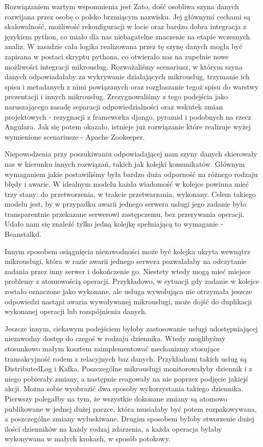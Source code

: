 \documentclass[licencjacka]{pracamgr}
\begin{document}
Rozwiązaniem wartym wspomnienia jest Zato, dość osobliwa szyna danych rozwijana przez osobę o polsko brzmiącym nazwisku. Jej głównymi cechami są skalowalność, możliwość rekonfiguracji w locie oraz bardzo dobra integracja z językiem python, co miało dla nas niebagatelne znaczenie na etapie wczesnych analiz. W zasadzie cała logika realizowana przez tę szynę danych mogła być zapisana w postaci skryptu pythona, co otwierało nas na zupełnie nowe możliwości integracji mikrousług. Rozważaliśmy scenariusz, w którym szyna danych odpowiadałaby za wykrywanie działających mikrousług, trzymanie ich spisu i metadanych z nimi powiązanych oraz rozgłaszanie tegoż spisu do warstwy prezentacji i innych mikrousług. Zrezygnowaliśmy z tego podejścia jako naruszającego zasadę separacji odpowiedzialności oraz wskutek zmian projektowych - rezygnacji z frameworka django, pyramid i podobnych na rzecz Angulara. Jak się potem okazało, istnieje już rozwiązanie które realizuje wyżej wymienione scenariusze - Apache Zookeeper.

Niepowodzenia przy poszukiwaniu odpowiadającej nam szyny danych skierowały nas w kierunku innych rozwiązań, takich jak
kolejki komunikatów. Głównym wymaganiem jakie postawiliśmy była bardzo duża odporność na różnego rodzaju błędy i
awarie. W idealnym modelu każda wiadomość w kolejce powinna mieć trzy stany: do przetworzenia, w trakcie przetwarzania, wykonany. Celem takiego modelu jest, by w przypadku awarii jednego serwera usługi jego zadanie było transparentnie przekazane serwerowi zastępczemu, bez przerywania operacji. Udało nam się znaleźć tylko jedną kolejkę spełniającą to wymaganie - Beanstalkd.

Innym sposobem osiągnięcia niezawodności może być kolejka ukryta wewnątrz mikrousługi, która w razie awarii jednego serwera pozwalałaby na odczytanie zadania przez inny serwer i dokończenie go. Niestety wtedy mogą mieć miejsce problemy z atomowością operacji. Przykładowo, w sytuacji gdy zadanie w kolejce zostało oznaczone jako wykonane, ale usługa wywołująca nie otrzymała jeszcze odpowiedzi nastąpi awaria wywoływanej mikrousługi, może dojść do duplikacji wykonanej operacji lub rozspójnienia danych.

Jeszcze innym, ciekawym podejściem byłoby zastosowanie usługi udostępniającej niezawodny dostęp do czegoś w rodzaju dziennika. Wtedy moglibyśmy stosunkowo małym kosztem zaimplementować mechanizmy stosujące transakcyjność rodem z relacyjnych baz danych. Przykładami takich usług są DistributedLog i Kafka. Poszczególne mikrousługi monitorowałyby dziennik i z niego pobierały zmiany, a następnie reagowały na nie poprzez podjęcie jakiejś akcji. Można sobie wyobrazić dwa sposoby wykorzystania takiego dziennika. Pierwszy polegałby na tym, że wszystkie dokonane zmiany są atomowo publikowane w jednej dużej paczce, która musiałaby być potem rozpakowywana, a poszczególne zmiany wyłuskiwane. Drugim sposobem byłoby stworzenie dużej ilości dzienników na każdy rodzaj zdarzenia, a każda operacja byłaby wykonywana w małych krokach, w sposób potokowy.
\end{document}
